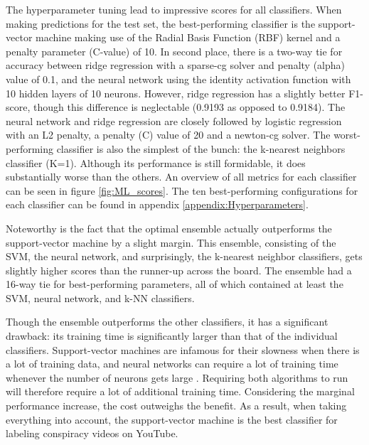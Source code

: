 \documentclass[../main.tex]{subfiles}
\begin{document}
The hyperparameter tuning lead to impressive scores for all classifiers. When making predictions for the
test set, the best-performing classifier is the support-vector machine making use of the Radial Basis
Function (RBF) kernel and a penalty parameter (C-value) of 10. In second place, there is a two-way tie
for accuracy between ridge regression with a sparse-cg solver and penalty (alpha) value of 0.1, and the
neural network using the identity activation function with 10 hidden layers of 10 neurons. However,
ridge regression has a slightly better F1-score, though this difference is neglectable (0.9193 as
opposed to 0.9184). The neural network and ridge regression are closely followed by logistic regression
with an L2 penalty, a penalty (C) value of 20 and a newton-cg solver. The worst-performing classifier is
also the simplest of the bunch: the k-nearest neighbors classifier (K=1). Although its performance is
still formidable, it does substantially worse than the others. An overview of all metrics for each
classifier can be seen in figure \ref{fig:ML_scores}. The ten best-performing configurations for each
classifier can be found in appendix \ref{appendix:Hyperparameters}.

Noteworthy is the fact that the optimal ensemble actually outperforms the support-vector machine by a
slight margin. This ensemble, consisting of the SVM, the neural network, and surprisingly, the k-nearest
neighbor classifiers, gets slightly higher scores than the runner-up across the board. The ensemble had
a 16-way tie for best-performing parameters, all of which contained at least the SVM, neural network,
and k-NN classifiers. 

Though the ensemble outperforms the other classifiers, it has a significant drawback: its training time
is significantly larger than that of the individual classifiers. Support-vector machines are infamous
for their slowness when there is a lot of training data, and neural networks can require a lot of
training time whenever the number of neurons gets large \citep{burges1997improving,
kamarthi1999accelerating}. Requiring both algorithms to run will therefore require a lot of additional
training time. Considering the marginal performance increase, the cost outweighs the benefit. As a
result, when taking everything into account, the support-vector machine is the best classifier for
labeling conspiracy videos on YouTube.  
\end{document}
